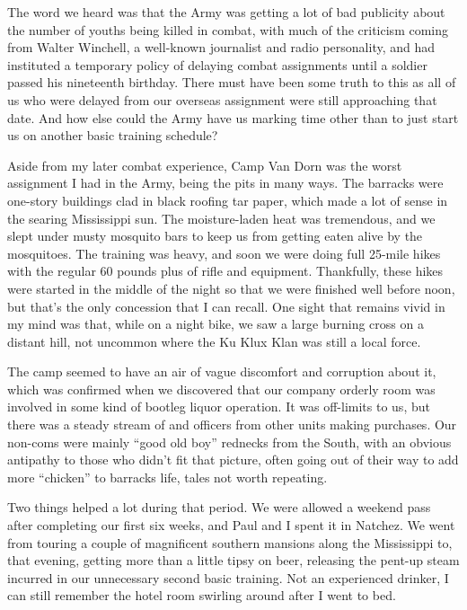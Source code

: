 \documentclass[../m3y]{subfiles}
\begin{document}
The word we heard was that the Army was getting a lot of bad publicity about the number of youths being killed in combat, with much of the criticism coming from Walter Winchell, a well-known journalist and radio personality, and had instituted a temporary policy of delaying combat assignments until a soldier passed his nineteenth birthday. There must have been some truth to this as all of us who were delayed from our overseas assignment were still approaching that date. And how else could the Army have us marking time other than to just start us on another basic training schedule?

Aside from my later combat experience, Camp Van Dorn was the worst assignment I had in the Army, being the pits in many ways. The barracks were one-story buildings clad in black roofing tar paper, which made a lot of sense in the searing Mississippi sun. The moisture-laden heat was tremendous, and we slept under musty mosquito bars to keep us from getting eaten alive by the mosquitoes. The training was heavy, and soon we were doing full 25-mile hikes with the regular 60 pounds plus of rifle and equipment. Thankfully, these hikes were started in the middle of the night so that we were finished well before noon, but that's the only concession that I can recall. One sight that remains vivid in my mind was that, while on a night bike, we saw a large burning cross on a distant hill, not uncommon where the Ku Klux Klan was still a local force.

The camp seemed to have an air of vague discomfort and corruption about it, which was confirmed when we discovered that our company orderly room was involved in some kind of bootleg liquor operation. It was off-limits to us, but there was a steady stream of and officers from other units making purchases. Our non-coms were mainly ``good old boy'' rednecks from the South, with an obvious antipathy to those who didn't fit that picture, often going out of their way to add more ``chicken'' to barracks life, tales not worth repeating.

Two things helped a lot during that period. We were allowed a weekend pass after completing our first six weeks, and Paul and I spent it in Natchez. We went from touring a couple of magnificent southern mansions along the Mississippi to, that evening, getting more than a little tipsy on beer, releasing the pent-up steam incurred in our unnecessary second basic training. Not an experienced drinker, I can still remember the hotel room swirling around after I went to bed.
\end{document}

